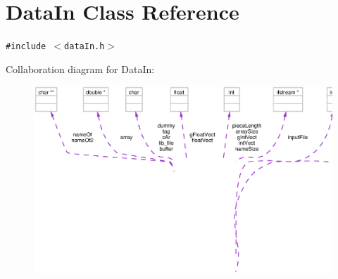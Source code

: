 \section{Data\-In Class Reference}
\label{classDataIn}
{\tt \#include $<$data\-In.h$>$}

Collaboration diagram for Data\-In:\begin{figure}[H]
\begin{center}
\leavevmode
\includegraphics[width=373pt]{classDataIn__coll__graph}
\end{center}
\end{figure}
